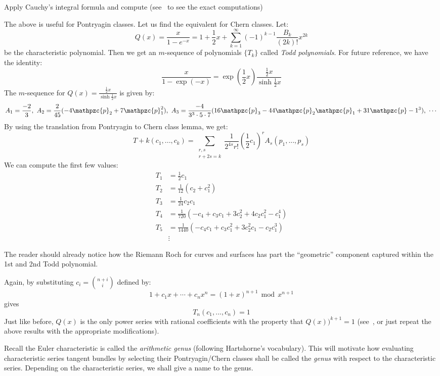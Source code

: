 \documentclass{book}
\newenvironment{Proof}[1][]
  {\begin{ProofTcb}[#1]}
  {\end{ProofTcb}}
\newcommand{\cp}{{\mathpzc{p}}}
\renewcommand{\mod}{\,\operatorname{mod}\,}
\begin{document}
\begin{Proof}
  Apply Cauchy's integral formula and compute (see~\cite[p.12]{hirzebruchTopologicalMethodsAlgebraic1995} to
  see the exact computations)
\end{Proof}

The above is useful for Pontryagin classes. Let us find the equivalent for Chern classes. Let:
\[
  Q(x) = \frac{x}{1-e^{-x}} = 1 + \frac{1}{2}x + \sum_{k=1}^\infty (-1)^{k-1} \frac{B_k}{(2k)!}x^{2k}
\]
be the characteristic polynomial. Then we get an $m$-sequence of polynomials $\{T_k\}$ called \emph{Todd
polynomials}. For future reference, we have the identity:
\[
  \frac{x}{1-\exp(-x)} = \exp \left(\frac{1}{2}x\right) \frac{\frac{1}{2}x}{\sinh \frac{1}{2}x}
\]
The $m$-sequence for $Q(x) = \frac{\frac{1}{2}x}{\sinh \frac{1}{2}x}$ is given by:
\[
  A_1 = \frac{-2}{3},\ A_2 = \frac{2}{45}(-4\cp_2+7\cp_1^2),\  A_3 = \frac{-4}{3^3\cdot 5\cdot 7}(16\cp_3
  -44\cp_2\cp_1 + 31\cp-1^3),\ \cdots
\]
By using the translation from Pontryagin to Chern class lemma, we get:
\[
  T+k(c_1, ..., c_k) = \sum_{\substack{r,s\\r+2s=k}} \frac{1}{2^{4s}r!} \left(\frac{1}{2}c_1\right)^r A_s(p_1, ..., p_s)
\]
We can compute the first few values:
\begin{align*}
  T_1 &= \frac{1}{2}c_1\\
  T_2 &= \frac{1}{12} (c_2 + c_1^2)\\
  T_3 &= \frac{1}{24} c_2c_1\\
  T_4 &= \frac{1}{720} (-c_4 + c_3c_1 + 3c_2^2 + 4c_2c_1^2 - c_1^4)\\
  T_5 &= \frac{1}{1440} \left(-c_4c_1 + c_3c_1^2  +3c_2^2c_1 - c_2c_1^3\right) \\
      &\vdots
\end{align*}

The reader should already notice how the Riemann Roch for curves and surfaces has part the ``geometric''
component captured within the 1st and 2nd Todd polynomial.

Again, by substituting $c_i = \binom{n+i}{i}$ defined by:
\[
  1 + c_1x + \cdots + c_nx^n = (1+x)^{n+1} \mod x^{n+1}
\]
gives
\[
  T_n(c_1, ..., c_n) = 1
\]
Just like before, $Q(x)$ is the only power series with rational coefficients with the property that
$Q(x))^{k+1} = 1$ (see~\cite[p.14]{hirzebruchTopologicalMethodsAlgebraic1995}, or just repeat the above
results with the appropriate modifications).

Recall the Euler characteristic is called the \emph{arithmetic genus} (following Hartshorne's vocabulary).
This will motivate how evaluating characteristic series tangent bundles by selecting their Pontryagin/Chern
classes shall be called the \emph{genus} with respect to the characteristic series. Depending on the
characteristic series, we shall give a name to the genus.
\end{document}
